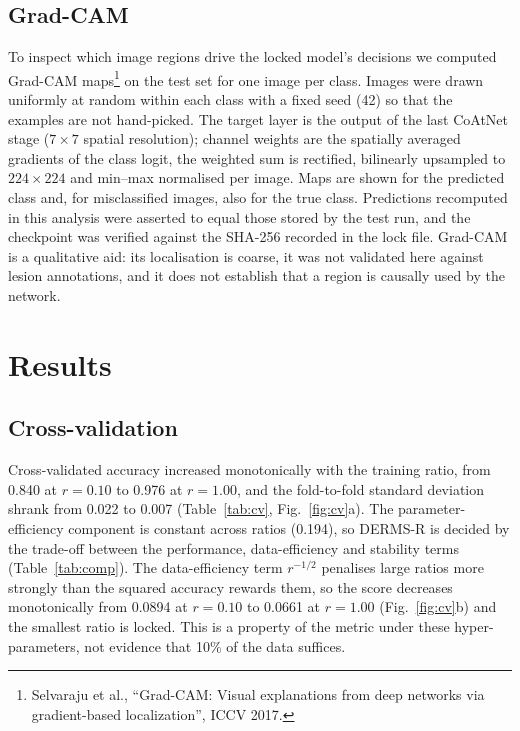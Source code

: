 \documentclass[10pt,a4paper]{article}
\begin{document}
\subsection{Grad-CAM}
To inspect which image regions drive the locked model's decisions we computed Grad-CAM maps\footnote{Selvaraju et al., ``Grad-CAM: Visual explanations from deep networks via gradient-based localization'', ICCV 2017.} on the test set for one image per class. Images were drawn uniformly at random within each class with a fixed seed (42) so that the examples are not hand-picked. The target layer is the output of the last CoAtNet stage ($7\times7$ spatial resolution); channel weights are the spatially averaged gradients of the class logit, the weighted sum is rectified, bilinearly upsampled to $224\times224$ and min--max normalised per image. Maps are shown for the predicted class and, for misclassified images, also for the true class. Predictions recomputed in this analysis were asserted to equal those stored by the test run, and the checkpoint was verified against the SHA-256 recorded in the lock file. Grad-CAM is a qualitative aid: its localisation is coarse, it was not validated here against lesion annotations, and it does not establish that a region is causally used by the network.

\section{Results}
\subsection{Cross-validation}
Cross-validated accuracy increased monotonically with the training ratio, from 0.840 at $r=0.10$ to 0.976 at $r=1.00$, and the fold-to-fold standard deviation shrank from 0.022 to 0.007 (Table~\ref{tab:cv}, Fig.~\ref{fig:cv}a). The parameter-efficiency component is constant across ratios (0.194), so DERMS-R is decided by the trade-off between the performance, data-efficiency and stability terms (Table~\ref{tab:comp}). The data-efficiency term $r^{-1/2}$ penalises large ratios more strongly than the squared accuracy rewards them, so the score decreases monotonically from 0.0894 at $r=0.10$ to 0.0661 at $r=1.00$ (Fig.~\ref{fig:cv}b) and the smallest ratio is locked. This is a property of the metric under these hyper-parameters, not evidence that 10\% of the data suffices.
\end{document}
